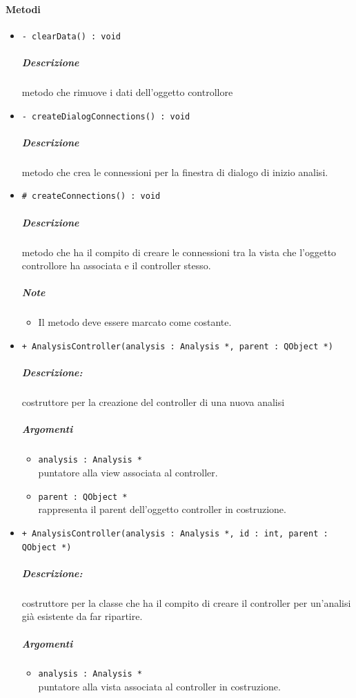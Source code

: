 	\paragraph{\color{black}Metodi}
		\begin{itemize}
			\item \color{blue} \verb!- clearData() : void!
			\color{black}
			\subparagraph{Descrizione} metodo che rimuove i dati dell'oggetto controllore
			\item \color{blue} \verb!- createDialogConnections() : void!
			\color{black}
			\subparagraph{Descrizione} metodo che crea le connessioni per la finestra di dialogo di inizio analisi.
			\item \color{blue} \verb!# createConnections() : void!
			\color{black}
			\subparagraph{Descrizione} metodo che ha il compito di creare le connessioni tra la vista che l'oggetto controllore ha associata e il controller stesso.
			\subparagraph{Note}
			\begin{itemize}
				\item Il metodo deve essere marcato come costante.
			\end{itemize}
			\item \color{blue} \verb!+ AnalysisController(analysis : Analysis *, parent : QObject *)!
			\color{black}
			\subparagraph{Descrizione:} costruttore per la creazione del controller di una nuova analisi
			\color{black}
			\subparagraph{Argomenti}
			\begin{itemize}
				\item \color{RoyalPurple} \verb!analysis : Analysis *!\\				
\color{black} puntatore alla view associata al controller.
				\item \color{RoyalPurple} \verb!parent : QObject *!\\				
\color{black} rappresenta il parent dell'oggetto controller in costruzione.
			\end{itemize}
			\item \color{blue} \verb!+ AnalysisController(analysis : Analysis *, id : int, parent : QObject *)!
			\color{black}
			\subparagraph{Descrizione:} costruttore per la classe che ha il compito di creare il controller per un'analisi già esistente da far ripartire.
			\color{black}
			\subparagraph{Argomenti}
			\begin{itemize}
				\item \color{RoyalPurple} \verb!analysis : Analysis *!\\				
\color{black} puntatore alla vista associata al controller in costruzione.

\end{itemize}
\end{itemize}
